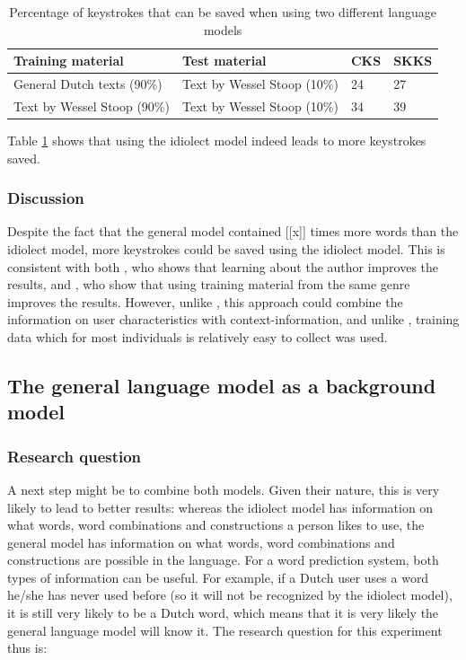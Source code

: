 \documentclass[12pt]{article}
\begin{document}
\begin{table}[h]
\begin{tabular}{ll|ll} 
Training material&Test material&CKS&SKKS\\
\hline
General Dutch texts (90\%)&Text by Wessel Stoop (10\%)&24&27\\
Text by Wessel Stoop (90\%)&Text by Wessel Stoop (10\%)&34&39\\
\end{tabular} 
\caption{Percentage of keystrokes that can be saved when using two different language models} \label{results_simple}
\end{table}

Table \ref{results_simple} shows that  using the idiolect model indeed leads to more keystrokes saved. 

\subsubsection{Discussion}
Despite the fact that the general model contained [[x]] times more words than the idiolect model, more keystrokes could be saved using the idiolect model. This is consistent with both , who shows that learning about the author improves the results, and , who show that using training material from the same genre improves the results. However, unlike , this approach could combine the information on user characteristics with context-information, and unlike , training data which for most individuals is relatively easy to collect was used.


\subsection{The general language model as a background model} \label{background}

\subsubsection{Research question}
A next step might be to combine both models. Given their nature, this is very likely to lead to better results: whereas the idiolect model has information on what words, word combinations and constructions a person likes to use, the general model has information on what words, word combinations and constructions are possible in the language. For a word prediction system, both types of information can be useful. For example, if a Dutch user uses a word he/she has never used before (so it will not be recognized by the idiolect model), it is still very likely to be a Dutch word, which means that it is very likely the general language model will know it. The research question for this experiment thus is:
\end{document}
